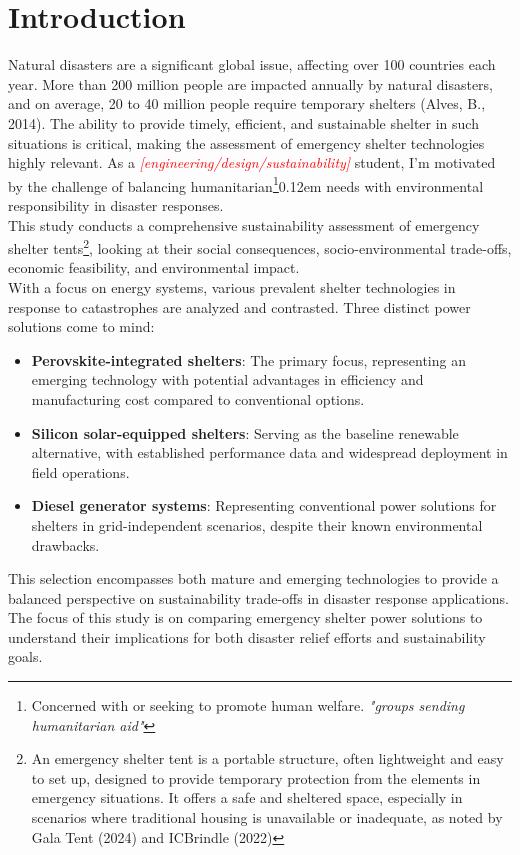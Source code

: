\documentclass{article}
\begin{document}
\section{Introduction}
Natural disasters are a significant global issue, affecting over 100 countries each year. More than 200 million people are impacted annually by natural disasters, and on average, 20 to 40 million people require temporary shelters (Alves, B., 2014). The ability to provide timely, efficient, and sustainable shelter in such situations is critical, making the assessment of emergency shelter technologies highly relevant. As a \textcolor{red}{\textit{[engineering/design/sustainability]}} student, I'm motivated by the challenge of balancing humanitarian\footnote{Concerned with or seeking to promote human welfare. \textit{"groups sending humanitarian aid"}}\kern0.12em needs with environmental responsibility in disaster responses.\\[8pt]
This study conducts a comprehensive sustainability assessment of emergency shelter tents\footnote{An emergency shelter tent is a portable structure, often lightweight and easy to set up, designed to provide temporary protection from the elements in emergency situations. It offers a safe and sheltered space, especially in scenarios where traditional housing is unavailable or inadequate, as noted by Gala Tent (2024) and ICBrindle (2022)}, looking at their social consequences, socio-environmental trade-offs, economic feasibility, and environmental impact.\\[8pt]
With a focus on energy systems, various prevalent shelter technologies in response to catastrophes are analyzed and contrasted.
Three distinct power solutions come to mind:
	\begin{itemize}
		\item \textbf{Perovskite-integrated shelters}: The primary focus, representing an emerging technology with potential advantages in efficiency and manufacturing cost compared to conventional options.
		\item \textbf{Silicon solar-equipped shelters}: Serving as the baseline renewable alternative, with established performance data and widespread deployment in field operations.
		\item \textbf{Diesel generator systems}: Representing conventional power solutions for shelters in grid-independent scenarios, despite their known environmental drawbacks.
	\end{itemize}
This selection encompasses both mature and emerging technologies to provide a balanced perspective on sustainability trade-offs in disaster response applications.\\[8pt]
The focus of this study is on comparing emergency shelter {power solutions} to understand their implications for both disaster relief efforts and sustainability goals.
\end{document}
